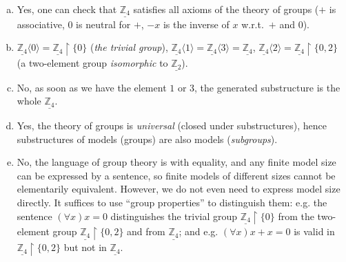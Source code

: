 \begin{problem}
\begin{solution}
        \begin{enumerate}[(a)]
            \item Yes, one can check that $\underline{\mathbb Z_4}$ satisfies all axioms of the theory of groups ($+$ is associative, $0$ is neutral for $+$, $-x$ is the inverse of $x$ w.r.t.\ $+$ and $0$).
            \item $\underline{\mathbb Z_4}\langle 0\rangle=\underline{\mathbb Z_4}\restriction\{0\}$ (\emph{the trivial group}), $\underline{\mathbb Z_4}\langle 1\rangle=\underline{\mathbb Z_4}\langle 3\rangle=\underline{\mathbb Z_4}$, $\underline{\mathbb Z_4}\langle 2\rangle=\underline{\mathbb Z_4}\restriction\{0,2\}$ (a two-element group \emph{isomorphic} to $\underline{\mathbb Z_2}$).
            \item No, as soon as we have the element $1$ or $3$, the generated substructure is the whole $\underline{\mathbb Z_4}$.
            \item Yes, the theory of groups is \emph{universal} (closed under substructures), hence substructures of models (groups) are also models (\emph{subgroups}).
            \item No, the language of group theory is with equality, and any finite model size can be expressed by a sentence, so finite models of different sizes cannot be elementarily equivalent. However, we do not even need to express model size directly. It suffices to use ``group properties'' to distinguish them: e.g. the sentence $(\forall x)x=0$ distinguishes the trivial group $\underline{\mathbb Z_4}\restriction\{0\}$ from the two-element group $\underline{\mathbb Z_4}\restriction\{0,2\}$ and from $\underline{\mathbb Z_4}$; and e.g. $(\forall x)x+x=0$ is valid in $\underline{\mathbb Z_4}\restriction\{0,2\}$ but not in $\underline{\mathbb Z_4}$.
        \end{enumerate}
                    
    \end{solution}

\end{problem}


